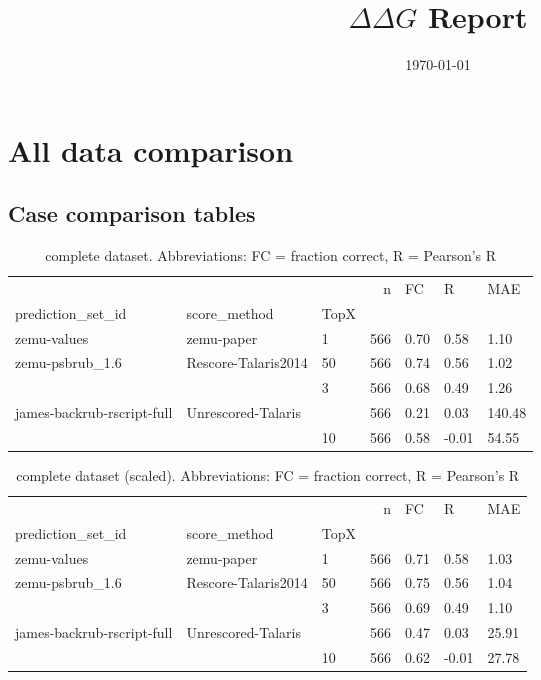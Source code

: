 \documentclass[10pt, letterpaper, oneside, titlepage, landscape]{scrreprt}
\title{$\Delta\Delta G$ Report}
\date{\today}
\begin{document}
\maketitle
\tableofcontents

\clearpage

\chapter{All data comparison}


\clearpage

\section{Case comparison tables}

\begin{table}[H]
\begin{tabular}{lllrlll}
\toprule
                           &                     &    &    n &    FC &      R &     MAE \\
prediction\_set\_id & score\_method & TopX &      &       &        &         \\
\midrule
zemu-values & zemu-paper & 1  &  566 &  0.70 &   0.58 &    1.10 \\
zemu-psbrub\_1.6 & Rescore-Talaris2014 & 50 &  566 &  0.74 &   0.56 &    1.02 \\
                           &                     & 3  &  566 &  0.68 &   0.49 &    1.26 \\
james-backrub-rscript-full & Unrescored-Talaris &    &  566 &  0.21 &   0.03 &  140.48 \\
                           &                     & 10 &  566 &  0.58 &  -0.01 &   54.55 \\
\bottomrule
\end{tabular}
\caption{complete dataset. Abbreviations: FC = fraction correct, R = Pearson's R}
\end{table}
\begin{table}[H]
\begin{tabular}{lllrlll}
\toprule
                           &                     &    &    n &    FC &      R &    MAE \\
prediction\_set\_id & score\_method & TopX &      &       &        &        \\
\midrule
zemu-values & zemu-paper & 1  &  566 &  0.71 &   0.58 &   1.03 \\
zemu-psbrub\_1.6 & Rescore-Talaris2014 & 50 &  566 &  0.75 &   0.56 &   1.04 \\
                           &                     & 3  &  566 &  0.69 &   0.49 &   1.10 \\
james-backrub-rscript-full & Unrescored-Talaris &    &  566 &  0.47 &   0.03 &  25.91 \\
                           &                     & 10 &  566 &  0.62 &  -0.01 &  27.78 \\
\bottomrule
\end{tabular}
\caption{complete dataset (scaled). Abbreviations: FC = fraction correct, R = Pearson's R}
\end{table}
\end{document}
